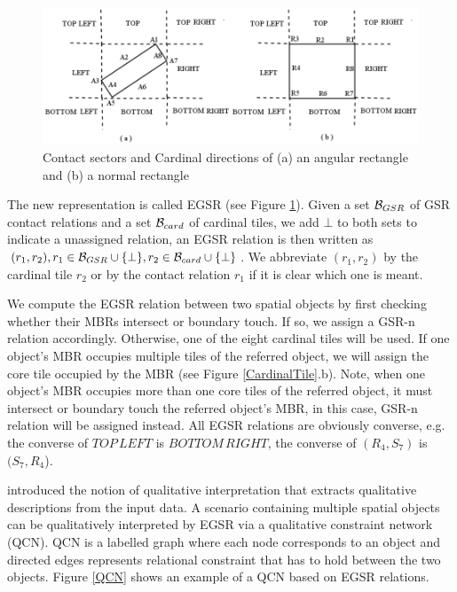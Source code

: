 \documentclass[letterpaper]{article}
\begin{document}
\begin{figure}[h!]
\centering\includegraphics[scale=0.25]{EGSR-relations.png}\caption{Contact sectors and Cardinal directions of (a) an angular rectangle and (b) a normal rectangle}
\label{EGSR}
\end{figure}
The new representation is called EGSR (see Figure \ref{EGSR}). Given a set ${\cal B}_{GSR}$ of GSR contact relations and a set ${\cal B}_{card}$ of cardinal tiles,  we add $\bot$ to both sets to indicate a unassigned relation, an EGSR relation is then written as $(r_1, r_2), r_1 \in {\cal B}_{GSR}\cup \{\bot\}, r_2 \in {\cal B}_{card}\cup \{\bot\}$. We abbreviate $(r_1,r_2)$ by the cardinal tile $r_2$ or by the contact relation $r_1$ if it is clear which one is meant. 

We compute the EGSR relation between two spatial objects by first checking whether their MBRs intersect or boundary touch. If so, we assign a GSR-n relation accordingly. Otherwise, one of the eight cardinal tiles will be used. If one object's MBR occupies multiple tiles of the referred object, we will assign the core tile occupied by the MBR (see Figure \ref{CardinalTile}.b). Note, when one object's MBR occupies more than one core tiles of the referred object, it must intersect or boundary touch the referred object's MBR, in this case, GSR-n relation will be assigned instead. All EGSR relations are obviously converse, e.g. the converse of $TOP\,LEFT$ is $BOTTOM\,RIGHT$, the converse of $(R_4, S_7)$ is $(S_7,R_4$).

\cite{wallgrun2010qualitative} introduced the notion of qualitative interpretation that extracts qualitative descriptions from the input data. A scenario containing multiple spatial objects can be qualitatively interpreted by EGSR via a qualitative constraint network (QCN). QCN is a labelled graph where each node corresponds to an object and directed edges represents relational constraint that has to hold between the two objects. 
Figure \ref{QCN} shows an example of a QCN based on EGSR relations.
\end{document}
